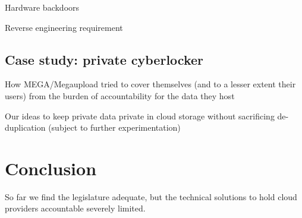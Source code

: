 \documentclass[11pt]{article}
\begin{document}

Hardware backdoors \cite{sparks2009chipset, duflot2010limits}

Reverse engineering requirement
\cite{rutkowska2008bluepilling}

\subsection{Case study: private cyberlocker}
\label{sec:cyberloker}
How MEGA/Megaupload tried to cover themselves (and to a lesser extent their users) from the burden of accountability for the data they host

Our ideas to keep private data private in cloud storage without sacrificing de-duplication
(subject to further experimentation)


\section{Conclusion}
So far we find the legislature adequate, but the technical solutions to hold cloud providers accountable severely limited.


{}

\end{document}
